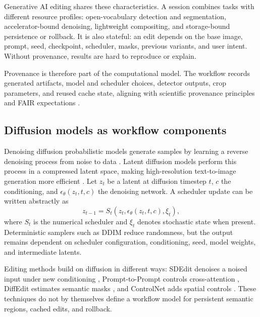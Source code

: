 \documentclass[final,5p,times,number,sort&compress]{elsarticle}
\begin{document}
Generative AI editing shares these characteristics. A session combines tasks with different resource profiles: open-vocabulary detection and segmentation, accelerator-bound denoising, lightweight compositing, and storage-bound persistence or rollback. It is also stateful: an edit depends on the base image, prompt, seed, checkpoint, scheduler, masks, previous variants, and user intent. Without provenance, results are hard to reproduce or explain.

Provenance is therefore part of the computational model. The workflow records generated artifacts, model and scheduler choices, detector outputs, crop parameters, and reused cache state, aligning with scientific provenance principles \citep{davidson2008provenance,moreau2013prov} and FAIR expectations \citep{wilkinson2016fair}.

\subsection{Diffusion models as workflow components}

Denoising diffusion probabilistic models generate samples by learning a reverse denoising process from noise to data \citep{ho2020ddpm}. Latent diffusion models perform this process in a compressed latent space, making high-resolution text-to-image generation more efficient \citep{rombach2022latent}. Let \(z_t\) be a latent at diffusion timestep \(t\), \(c\) the conditioning, and \(\epsilon_\theta(z_t,t,c)\) the denoising network. A scheduler update can be written abstractly as
\begin{equation}
    z_{t-1} = S_t\left(z_t, \epsilon_\theta(z_t,t,c), \xi_t\right),
\end{equation}
where \(S_t\) is the numerical scheduler and \(\xi_t\) denotes stochastic state when present. Deterministic samplers such as DDIM \citep{song2021ddim} reduce randomness, but the output remains dependent on scheduler configuration, conditioning, seed, model weights, and intermediate latents.

Editing methods build on diffusion in different ways: SDEdit denoises a noised input under new conditioning \citep{meng2022sdedit}, Prompt-to-Prompt controls cross-attention \citep{hertz2023prompt}, DiffEdit estimates semantic masks \citep{couairon2023diffedit}, and ControlNet adds spatial controls \citep{zhang2023controlnet}. These techniques do not by themselves define a workflow model for persistent semantic regions, cached edits, and rollback.
\end{document}
